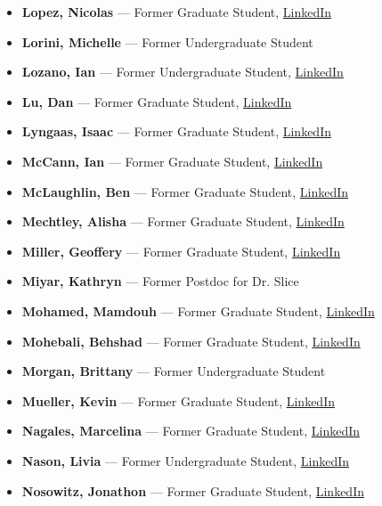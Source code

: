 \documentclass[12pt,a4paper]{article}
\begin{document}
\begin{itemize}
    \item \textbf{Lopez, Nicolas} --- Former Graduate Student, \href{https://www.linkedin.com/in/nicolas-lopez-81781b89/}{LinkedIn}
    \item \textbf{Lorini, Michelle} --- Former Undergraduate Student
    \item \textbf{Lozano, Ian} --- Former Undergraduate Student, \href{https://www.linkedin.com/in/ian-lozano-73600985/}{LinkedIn}
    \item \textbf{Lu, Dan} --- Former Graduate Student, \href{https://www.linkedin.com/in/dan-lu-77677023/}{LinkedIn}
    \item \textbf{Lyngaas, Isaac} --- Former Graduate Student, \href{https://www.linkedin.com/in/isaac-lyngaas-783515bb/}{LinkedIn}
    \item \textbf{McCann, Ian} --- Former Graduate Student, \href{https://www.linkedin.com/in/ian-mccann-53a55734/}{LinkedIn}
    \item \textbf{McLaughlin, Ben} --- Former Graduate Student, \href{https://www.linkedin.com/in/ben-mclaughlin-05b16982/}{LinkedIn}
    \item \textbf{Mechtley, Alisha} --- Former Graduate Student, \href{https://www.linkedin.com/in/alisha-mechtley-ph-d-28562444/}{LinkedIn}
    \item \textbf{Miller, Geoffery} --- Former Graduate Student, \href{https://www.linkedin.com/in/geoffery-miller-775b484b/}{LinkedIn}
    \item \textbf{Miyar, Kathryn} --- Former Postdoc for Dr. Slice
    \item \textbf{Mohamed, Mamdouh} --- Former Graduate Student, \href{https://www.linkedin.com/in/mamdouh-mohamed-ph-d-p-e-9080081a/}{LinkedIn}
    \item \textbf{Mohebali, Behshad} --- Former Graduate Student, \href{https://www.linkedin.com/in/behshad-mohebali-ph-d-6691456a/}{LinkedIn}
    \item \textbf{Morgan, Brittany} --- Former Undergraduate Student
    \item \textbf{Mueller, Kevin} --- Former Graduate Student, \href{https://www.linkedin.com/in/kevin-mueller-43890214b/}{LinkedIn}
    \item \textbf{Nagales, Marcelina} --- Former Graduate Student, \href{https://www.linkedin.com/in/marcelina-nagales-608b8b80/}{LinkedIn}
    \item \textbf{Nason, Livia} --- Former Undergraduate Student, \href{https://www.linkedin.com/in/livia-nason-946766150/}{LinkedIn}
    \item \textbf{Nosowitz, Jonathon} --- Former Graduate Student, \href{https://www.linkedin.com/in/jonathannosowitz/}{LinkedIn}

\end{itemize}
\end{document}
